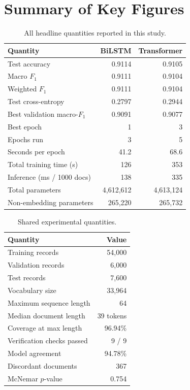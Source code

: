 \chapter{Summary of Key Figures}
\label{app:summary}

\begin{table}[ht]
\centering
\caption{All headline quantities reported in this study.}
\begin{tabular}{lrr}
\toprule
\textbf{Quantity} & \textbf{BiLSTM} & \textbf{Transformer} \\
\midrule
Test accuracy                    & 0.9114 & 0.9105 \\
Macro $F_1$         & 0.9111 & 0.9104 \\
Weighted $F_1$      & 0.9111 & 0.9104 \\
Test cross-entropy               & 0.2797 & 0.2944 \\
Best validation macro-$F_1$ & 0.9091 & 0.9077 \\
Best epoch                       & 1 & 3 \\
Epochs run                       & 3 & 5 \\
Seconds per epoch                & 41.2 & 68.6 \\
Total training time (s)          & 126 & 353 \\
Inference (ms / 1000 docs)       & 138 & 335 \\
Total parameters                 & 4{,}612{,}612 & 4{,}613{,}124 \\
Non-embedding parameters         & 265{,}220 & 265{,}732 \\
\bottomrule
\end{tabular}
\end{table}

\begin{table}[ht]
\centering
\caption{Shared experimental quantities.}
\begin{tabular}{lr}
\toprule
\textbf{Quantity} & \textbf{Value} \\
\midrule
Training records          & 54{,}000 \\
Validation records        & 6{,}000 \\
Test records              & 7{,}600 \\
Vocabulary size           & 33{,}964 \\
Maximum sequence length   & 64 \\
Median document length    & 39 tokens \\
Coverage at max length    & 96.94\% \\
Verification checks passed & 9 / 9 \\
Model agreement           & 94.78\% \\
Discordant documents      & 367 \\
McNemar $p$-value         & 0.754 \\
\bottomrule
\end{tabular}
\end{table}
